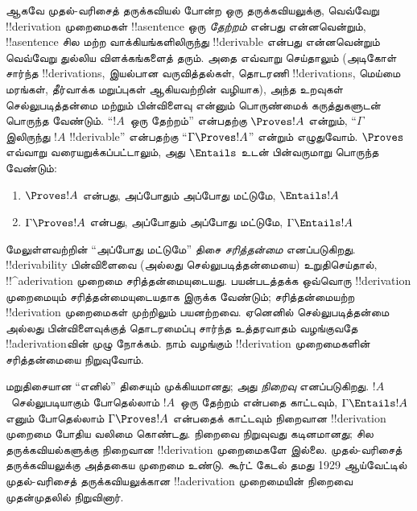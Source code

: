 \documentclass[../../../include/open-logic-section]{subfiles}
\begin{document}
ஆகவே முதல்-வரிசைத் தருக்கவியல் போன்ற ஒரு தருக்கவியலுக்கு, வெவ்வேறு
!!{derivation} முறைமைகள் !!a{sentence} ஒரு \emph{தேற்றம்} என்பது
என்னவென்றும், !!a{sentence} சில மற்ற வாக்கியங்களிலிருந்து
!!{derivable} என்பது என்னவென்றும் வெவ்வேறு துல்லிய விளக்கங்களைத் தரும்.
அதை எவ்வாறு செய்தாலும் (அடிகோள் சார்ந்த !!{derivation}s, இயல்பான
வருவித்தல்கள், தொடரணி !!{derivation}s, மெய்மை மரங்கள், தீர்வாக்க
மறுப்புகள் ஆகியவற்றின் வழியாக), அந்த உறவுகள் செல்லுபடித்தன்மை மற்றும்
பின்விளைவு என்னும் பொருண்மைக் கருத்துகளுடன் பொருந்த வேண்டும். ``$!A$~ஒரு
தேற்றம்'' என்பதற்கு $\Proves !A$ என்றும், ``$\Gamma$ இலிருந்து $!A$
!!{derivable}'' என்பதற்கு ``$\Gamma \Proves !A$'' என்றும் எழுதுவோம்.
$\Proves$ எவ்வாறு வரையறுக்கப்பட்டாலும், அது $\Entails$ உடன் பின்வருமாறு
பொருந்த வேண்டும்:
\begin{enumerate}
\item $\Proves !A$ என்பது, அப்போதும் அப்போது மட்டுமே, $\Entails !A$
\item $\Gamma \Proves !A$ என்பது, அப்போதும் அப்போது மட்டுமே,
  $\Gamma \Entails !A$
\end{enumerate}

மேலுள்ளவற்றின் ``அப்போது மட்டுமே'' திசை \emph{சரித்தன்மை} எனப்படுகிறது.
!!{derivability} பின்விளைவை (அல்லது செல்லுபடித்தன்மையை) உறுதிசெய்தால்,
!!^a{derivation} முறைமை சரித்தன்மையுடையது. பயன்படத்தக்க ஒவ்வொரு
!!{derivation} முறைமையும் சரித்தன்மையுடையதாக இருக்க வேண்டும்;
சரித்தன்மையற்ற !!{derivation} முறைமைகள் முற்றிலும் பயனற்றவை. ஏனெனில்
செல்லுபடித்தன்மை அல்லது பின்விளைவுக்குத் தொடரமைப்பு சார்ந்த உத்தரவாதம்
வழங்குவதே !!a{derivation}வின் முழு நோக்கம். நாம் வழங்கும் !!{derivation}
முறைமைகளின் சரித்தன்மையை நிறுவுவோம்.

மறுதிசையான ``எனில்'' திசையும் முக்கியமானது; அது \emph{நிறைவு}
எனப்படுகிறது. $!A$~செல்லுபடியாகும் போதெல்லாம் $!A$~ஒரு தேற்றம் என்பதை
காட்டவும், $\Gamma \Entails !A$ எனும் போதெல்லாம் $\Gamma \Proves !A$
என்பதைக் காட்டவும் நிறைவான !!{derivation} முறைமை போதிய வலிமை கொண்டது.
நிறைவை நிறுவுவது கடினமானது; சில தருக்கவியல்களுக்கு நிறைவான
!!{derivation} முறைமைகளே இல்லை. முதல்-வரிசைத் தருக்கவியலுக்கு அத்தகைய
முறைமை உண்டு. கூர்ட் கேடல் தமது 1929 ஆய்வேட்டில் முதல்-வரிசைத்
தருக்கவியலுக்கான !!a{derivation} முறைமையின் நிறைவை முதன்முதலில்
நிறுவினார்.
\end{document}
